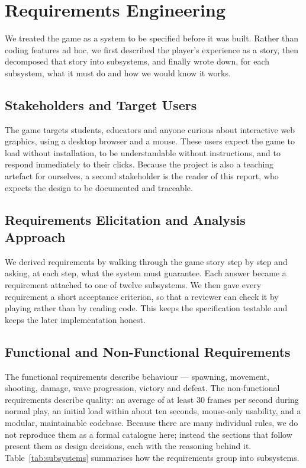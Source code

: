 \documentclass[12pt,a4paper]{report}
\begin{document}
\section{Requirements Engineering}

We treated the game as a system to be specified before it was built. Rather than
coding features ad hoc, we first described the player's experience as a story,
then decomposed that story into subsystems, and finally wrote down, for each
subsystem, what it must do and how we would know it works.

\subsection{Stakeholders and Target Users}

The game targets students, educators and anyone curious about interactive web
graphics, using a desktop browser and a mouse. These users expect the game to
load without installation, to be understandable without instructions, and to
respond immediately to their clicks. Because the project is also a teaching
artefact for ourselves, a second stakeholder is the reader of this report, who
expects the design to be documented and traceable.

\subsection{Requirements Elicitation and Analysis Approach}

We derived requirements by walking through the game story step by step and
asking, at each step, what the system must guarantee. Each answer became a
requirement attached to one of twelve subsystems. We then gave every requirement
a short acceptance criterion, so that a reviewer can check it by playing rather
than by reading code. This keeps the specification testable and keeps the later
implementation honest.

\subsection{Functional and Non-Functional Requirements}

The functional requirements describe behaviour --- spawning, movement, shooting,
damage, wave progression, victory and defeat. The non-functional requirements
describe quality: an average of at least 30 frames per second during normal
play, an initial load within about ten seconds, mouse-only usability, and a
modular, maintainable codebase. Because there are many individual rules, we do
not reproduce them as a formal catalogue here; instead the sections that follow
present them as design decisions, each with the reasoning behind it.
Table~\ref{tab:subsystems} summarises how the requirements group into
subsystems.
\end{document}
